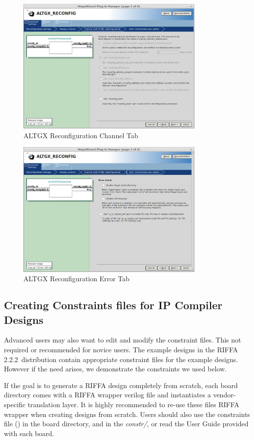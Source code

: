 \documentclass{refrep}
\newcommand{\RIFFAVer}{2.2.2}
\newcommand{\Directory}[1]{\textit{#1}}
\newcommand{\Altera}[1]{{\color{blue}{#1}}}
\begin{document}
\begin{figure}[H]
  \includegraphics[width=350px,center]{ALTGXReconfigTabChannel.png}
  \caption{ALTGX Reconfiguration Channel Tab}
  \label{Fig:Altera:ALTGX:TabChannel}
\end{figure}

\begin{figure}[H]
  \includegraphics[width=350px,center]{ALTGXReconfigTabError.png}
  \caption{ALTGX Reconfiguration Error Tab}
  \label{Fig:Altera:ALTGX:TabError}
\end{figure}

\pagebreak
\subsection{Creating Constraints files for IP Compiler Designs}
Advanced users may also want to edit and modify the constraint files. This not
required or recommended for novice users. The example designs in the RIFFA
\RIFFAVer~distribution contain appropriate constraint files for the example
designs. However if the need arises, we demonstrate the constraints we used
below.

If the goal is to generate a RIFFA design completely from scratch, each board
directory comes with a RIFFA wrapper verilog file and instantiates a
vendor-specific translation layer. It is highly recommended to re-use these
files RIFFA wrapper when creating designs from scratch. Users should also use
the constraints file (\Altera{.sdc}) in the board directory, and in the
\Directory{constr/}, or read the User Guide provided with each board.
\end{document}
